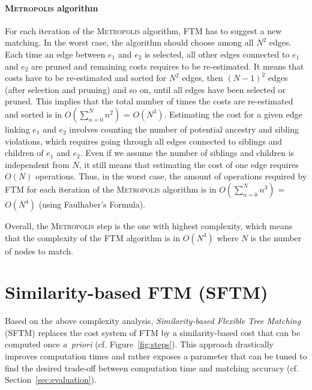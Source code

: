 \paragraph{\textsc{Metropolis} algorithm}
For each iteration of the \textsc{Metropolis} algorithm, FTM has to suggest a new matching.
In the worst case, the algorithm should choose among all $N^2$ edges.
Each time an edge between $e_1$ and $e_2$ is selected, all other edges connected to $e_1$ and $e_2$ are pruned and remaining costs requires to be re-estimated.
It means that costs have to be re-estimated and sorted for $N^2$ edges, then $(N-1)^2$ edges (after selection and pruning) and so on, until all edges have been selected or pruned.
This implies that the total number of times the costs are re-estimated and sorted is in $O(\sum^N_{n = 0}n^2)$ = $O(N^3)$.
Estimating the cost for a given edge linking $e_1$ and $e_2$ involves counting the number of potential ancestry and sibling violations, which requires going through all edges connected to siblings and children of $e_1$ and $e_2$.
Even if we assume the number of siblings and children is independent from $N$, it still means that estimating the cost of one edge requires $O(N)$ operations.
Thus, in the worst case, the amount of operations required by FTM for each iteration of the \textsc{Metropolis} algorithm is in $O(\sum^N_{n = 0}n^3)$ = $O(N^4)$ (using Faulhaber's Formula).

Overall, the \textsc{Metropolis} step is the one with highest complexity, which means that the complexity of the FTM algorithm is in $O(N^4)$ where $N$ is the number of nodes to match.

\section{Similarity-based FTM (SFTM)}\label{sec:SFTM}
Based on the above complexity analysis, \emph{Similarity-based Flexible Tree Matching} (SFTM) replaces the cost system of FTM by a similarity-based cost that can be computed once \textit{a~priori} (cf. Figure~\ref{fig:steps}).
This approach drastically improves computation times and rather exposes a parameter that can be tuned to find the desired trade-off between computation time and matching accuracy (cf. Section~\ref{sec:evaluation}).

